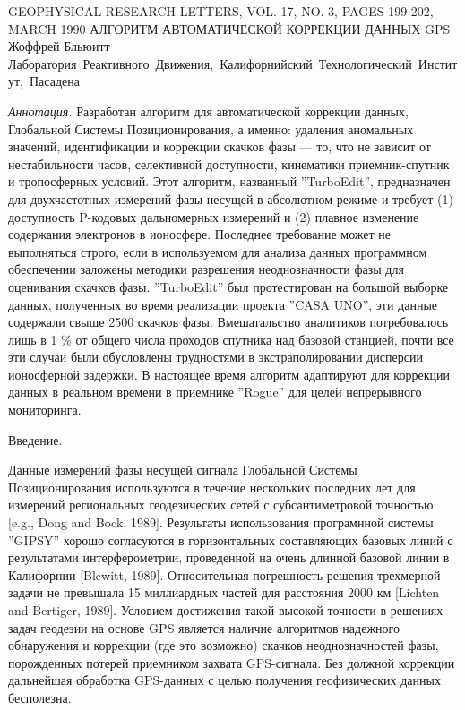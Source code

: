 \documentclass[12pt,a4paper]{article}
\begin{document}
\begin{center}
GEOPHYSICAL RESEARCH LETTERS, VOL. 17, NO. 3, PAGES 199-202, MARCH 1990
\bigbreak
АЛГОРИТМ АВТОМАТИЧЕСКОЙ КОРРЕКЦИИ ДАННЫХ GPS
\medbreak
Жоффрей Бльюитт
\medbreak
\mbox{Лаборатория Реактивного Движения, Калифорнийский Технологический Институт, Пасадена}
\end{center}

\emph{Аннотация.} Разработан алгоритм для автоматической коррекции данных,
Глобальной Системы Позиционирования, а именно: удаления аномальных значений, 
идентификации и коррекции скачков фазы --- то, что не зависит от нестабильности
часов, селективной доступности, кинематики приемник-спутник и тропосферных
условий. Этот алгоритм, названный ''TurboEdit'', предназначен для двухчастотных
измерений фазы несущей в абсолютном режиме и требует (1) доступность P-кодовых 
дальномерных измерений и (2) плавное изменение содержания электронов в 
ионосфере. Последнее требование может не выполняться строго, если в 
используемом для анализа данных программном обеспечении заложены методики 
разрешения неоднозначности фазы для оценивания скачков фазы. ''TurboEdit''
был протестирован на большой выборке данных, полученных во время реализации
проекта ''CASA UNO'', эти данные содержали свыше 2500 скачков фазы.
Вмешатальство аналитиков потребовалось лишь в 1 \% от общего числа проходов
спутника над базовой станцией, почти все эти случаи были обусловлены
трудностями в экстраполировании дисперсии ионосферной задержки. В настоящее
время алгоритм адаптируют для коррекции данных в реальном времени в приемнике
''Rogue'' для целей непрерывного мониторинга.

\medbreak
\begin{center}
	Введение. 
\end{center}

\medbreak
Данные измерений фазы несущей сигнала Глобальной Системы Позиционирования
используются в течение нескольких последних лет для измерений региональных
геодезических сетей с субсантиметровой точностью [e.g., Dong and Bock, 1989]. 
Результаты использования програмнной системы ''GIPSY'' хорошо согласуются в 
горизонтальных составляющих базовых линий с результатами интерферометрии, 
проведенной на очень длинной базовой линии в Калифорнии [Blewitt, 1989].
Относительная погрешность решения трехмерной задачи не превышала 15 миллиардных
частей для расстояния 2000 км [Lichten and Bertiger, 1989]. Условием достижения
такой высокой точности в решениях задач геодезии на основе GPS является наличие
алгоритмов надежного обнаружения и коррекции (где это возможно) скачков 
неоднозначностей фазы,
порожденных потерей приемником захвата GPS-сигнала. Без должной коррекции
дальнейшая обработка GPS-данных с целью получения геофизических данных
бесполезна.
\end{document}
